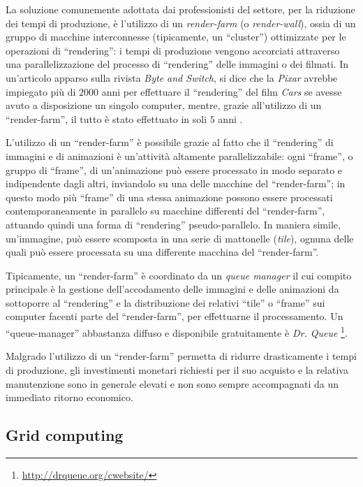 La soluzione comunemente adottata dai professionisti del settore, per la riduzione dei tempi di produzione, \`e l'utilizzo di un \emph{render-farm} (o \emph{render-wall}), ossia di un gruppo di macchine interconnesse (tipicamente, un ``cluster'') ottimizzate per le operazioni di ``rendering'': i tempi di produzione vengono accorciati attraverso una parallelizzazione del processo di ``rendering'' delle immagini o dei filmati.
In un'articolo apparso sulla rivista \emph{Byte and Switch}, si dice che la \emph{Pixar} avrebbe impiegato pi\`u di $2000$ anni per effettuare il ``rendering'' del film \emph{Cars} se avesse avuto a disposizione un singolo computer, mentre, grazie all'utilizzo di un ``render-farm'', il tutto \`e stato effettuato in soli $5$ anni \cite{ByteAndSwitch2006Pixar}.

L'utilizzo di un ``render-farm'' \`e possibile grazie al fatto che il ``rendering'' di immagini e di animazioni \`e un'attivit\`a altamente parallelizzabile: ogni ``frame'', o gruppo di ``frame'', di un'animazione pu\`o essere processato in modo separato e indipendente dagli altri, inviandolo su una delle macchine del ``render-farm''; in questo modo pi\`u ``frame'' di una stessa animazione possono essere processati contemporaneamente in parallelo su macchine differenti del ``render-farm'', attuando quindi una forma di ``rendering'' pseudo-parallelo. In maniera simile, un'immagine, pu\`o essere scomposta in una serie di mattonelle (\emph{tile}), ognuna delle quali pu\`o essere processata su una differente macchina del ``render-farm''.

Tipicamente, un ``render-farm'' \`e coordinato da un \emph{queue manager} il cui compito principale \`e la gestione dell'accodamento delle immagini e delle animazioni da sottoporre al ``rendering'' e la distribuzione dei relativi ``tile'' o ``frame'' sui computer facenti parte del ``render-farm'', per effettuarne il processamento. Un ``queue-manager'' abbastanza diffuso e disponibile gratuitamente \`e \emph{Dr. Queue} \footnote{\href{http://drqueue.org/cwebsite/}{http://drqueue.org/cwebsite/}}.

Malgrado l'utilizzo di un ``render-farm'' permetta di ridurre drasticamente i tempi di produzione, gli investimenti monetari richiesti per il suo acquisto e la relativa manutenzione sono in generale elevati e non sono sempre accompagnati da un immediato ritorno economico.

\subsection{Grid computing} \label{ssec:intro-grid}

